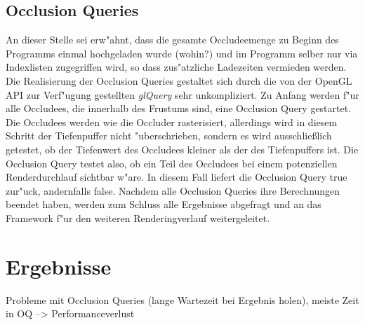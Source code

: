 \documentclass[journal]{vgtc}
\begin{document}
\subsection{Occlusion Queries}
An dieser Stelle sei erw"ahnt, dass die gesamte Occludeemenge zu Beginn des Programms einmal hochgeladen wurde (wohin?) und im Programm selber nur via Indexlisten zugegriffen wird, so dass zus"atzliche Ladezeiten vermieden werden. Die Realisierung der Occlusion Queries gestaltet sich durch die von der OpenGL API zur Verf"ugung gestellten \textit{glQuery} sehr unkompliziert. Zu Anfang werden f"ur alle Occludees, die innerhalb des Frustums sind, eine Occlusion Query gestartet. Die Occludees werden wie die Occluder rasterisiert, allerdings wird in diesem Schritt der Tiefenpuffer nicht "uberschrieben, sondern es wird ausschlie{\ss}lich getestet, ob der Tiefenwert des Occludees kleiner als der des Tiefenpuffers ist. Die Occlusion Query testet also, ob ein Teil des Occludees bei einem potenziellen Renderdurchlauf sichtbar w"are. In diesem Fall liefert die Occlusion Query \glqq true\grqq{} zur"uck, andernfalls \glqq false\grqq{}. Nachdem alle Occlusion Queries ihre Berechnungen beendet haben, werden zum Schluss alle Ergebnisse abgefragt und an das Framework f"ur den weiteren Renderingverlauf weitergeleitet.


\section{Ergebnisse}
Probleme mit Occlusion Queries (lange Wartezeit bei Ergebnis holen), meiste Zeit in OQ --> Performanceverlust
\end{document}

